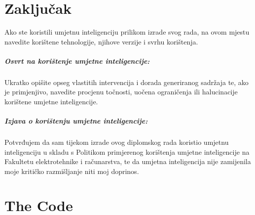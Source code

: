 \documentclass[diplomskirad]{fer}
\begin{document}
\chapter{Zaključak}
\label{pog:zakljucak}









\begin{izjavaoui}

  Ako ste koristili umjetnu inteligenciju prilikom izrade svog rada,
  na ovom mjestu navedite korištene tehnologije, njihove verzije i svrhu korištenja.

  \paragraph{Osvrt na korištenje umjetne inteligencije:}
  Ukratko opišite opseg vlastitih intervencija i dorada generiranog sadržaja te, ako je primjenjivo,
  navedite procjenu točnosti, uočena ograničenja ili halucinacije korištene umjetne inteligencije.

  \paragraph{Izjava o korištenju umjetne inteligencije:}
  Potvrđujem da sam tijekom izrade ovog diplomskog rada koristio umjetnu inteligenciju u skladu s
  Politikom primjerenog korištenja umjetne inteligencije na Fakultetu elektrotehnike i računarstva,
  te da umjetna inteligencija nije zamijenila moje kritičko razmišljanje niti moj doprinos.
  
\end{izjavaoui}



\backmatter

\chapter{The Code}
\end{document}
